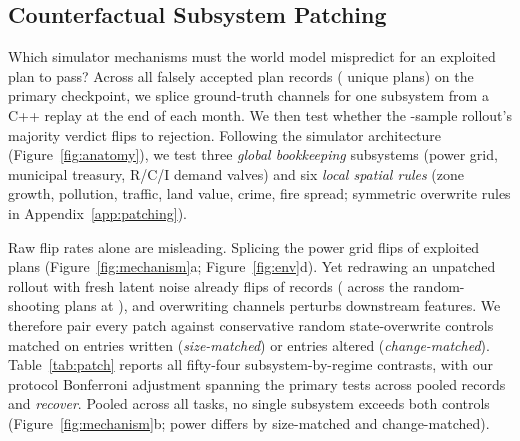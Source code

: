 \subsection{Counterfactual Subsystem Patching}\label{sec:mechanism}

Which simulator mechanisms must the world model mispredict for an exploited plan to pass? Across all \PtRecords{} falsely accepted plan records (\PtPlans{} unique plans) on the primary checkpoint, we splice ground-truth channels for one subsystem from a C++ replay at the end of each month. We then test whether the \KVerdict-sample rollout's majority verdict flips to rejection. Following the simulator architecture (Figure~\ref{fig:anatomy}), we test three \emph{global bookkeeping} subsystems (power grid, municipal treasury, R/C/I demand valves) and six \emph{local spatial rules} (zone growth, pollution, traffic, land value, crime, fire spread; symmetric overwrite rules in Appendix~\ref{app:patching}).

Raw flip rates alone are misleading. Splicing the power grid flips \PtPower{} of exploited plans (Figure~\ref{fig:mechanism}a; Figure~\ref{fig:env}d). Yet redrawing an unpatched rollout with fresh latent noise already flips \PtNone{} \ci{\PtNoneCI} of records (\PcRedraw{} \ci{\PcRedrawCI} across the \DecRecords{} random-shooting plans at ), and overwriting channels perturbs downstream features. We therefore pair every patch against conservative random state-overwrite controls matched on entries written (\emph{size-matched}) or entries altered (\emph{change-matched}). Table~\ref{tab:patch} reports all fifty-four subsystem-by-regime contrasts, with our protocol Bonferroni adjustment spanning the \PcComparisons{} primary tests across pooled records and \emph{recover}. Pooled across all tasks, no single subsystem exceeds both controls (Figure~\ref{fig:mechanism}b; power differs by \PcPowerSizeAll{} \ci{\PcPowerSizeAllCI} size-matched and \PcPowerChgAll{} \ci{\PcPowerChgAllCI} change-matched).

